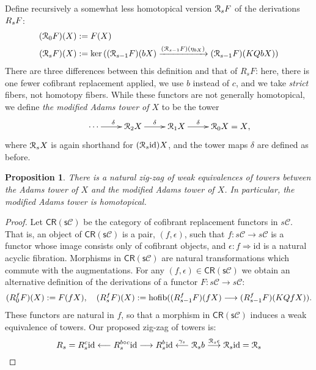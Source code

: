 \documentclass[11pt]{amsart} \renewcommand{\baselinestretch}{1.4}
\theoremstyle{plain}
\newtheorem{prop}[thm]{Proposition}
\theoremstyle{definition}
\renewcommand{\ker}{\mathrm{ker}\,}
\DeclareMathOperator*{\hofib}{hofib}
\renewcommand{\to}{\longrightarrow}
\newcommand{\from}{\longleftarrow}
\newcommand{\calR}{\mathcal{R}}
\newcommand{\calc}{\mathcal{C}}
\newcommand{\Id}{\mathrm{id}}
\newcommand{\algcat}{{\calc}}%
\newcommand{\dupdown}[2]{R_{\smash{#1}}}
\newcommand{\caldup}[1]{\calR_{\smash{#1}}}
\newcommand{\plainD}{R}
\newcommand{\barConstructionMightAbbreviate}{b}
\begin{document}
\begin{Bousfield-Kan spectral sequence}
Define recursively a somewhat less homotopical version $\caldup{s}F$ of the derivations $\dupdown{s}{}F$:
\begin{alignat*}{2}
(\caldup{0}F)(X)
&:=
F(X)%
\\
(\caldup{s}F)(X)
&:=
\ker((\caldup{s-1}F)(\barConstructionMightAbbreviate X)\xrightarrow{(\caldup{s-1}F)(\eta_{\barConstructionMightAbbreviate X})} (\caldup{s-1}F)(KQ\barConstructionMightAbbreviate X))
\end{alignat*}
There are three differences between this definition and that of $\plainD_sF$: here, there is one fewer cofibrant replacement applied, we use $\barConstructionMightAbbreviate $ instead of  $c$, and we take \emph{strict} fibers, not homotopy fibers.
While these functors are not generally homotopical, we define \emph{the modified Adams tower of $X$} to be the tower
\[\xymatrix@R=4mm{
\cdots 
\ar[r]^{\delta}
&%
\caldup{2}X
\ar[r]^{\delta}
&%
\caldup{1}X
\ar[r]^{\delta}&%
\caldup{0}X\makebox[0cm][l]{${}=X$,}
}\]
where $\caldup{s}X$ is again shorthand for $(\caldup{s}\Id )X$, and the tower maps $\delta$ are defined as before.
\begin{prop}
\label{prop:modifiedAdamsTower}
There is a natural zig-zag of weak equivalences of towers between the Adams tower of $X$ and the modified Adams tower of $X$. In particular, the modified Adams tower is homotopical.
\end{prop}
\begin{proof}
Let $\mathsf{CR(s\algcat)}$ be the category of cofibrant replacement functors in $s\algcat$. That is, an object of $\mathsf{CR(s\algcat)}$ is a pair, $(f,\epsilon)$, such that $f:s\algcat\to s\algcat$ is a functor whose image consists only of cofibrant objects, and $\epsilon:f\Rightarrow \Id $ is a natural acyclic fibration. Morphisms in $\mathsf{CR(s\algcat)}$ are natural transformations which commute with the augmentations. For any $(f,\epsilon)\in\mathsf{CR(s\algcat)}$ we obtain an alternative definition of the derivations of a functor $F:s\algcat\to s\algcat$:
\begin{alignat*}{2}
(\plainD_{\smash{0}}^{\smash{f}}F)(X)
:=
F(fX),\quad %
(\plainD_{\smash{s}}^{\smash{f}}F)(X)
:=
\hofib((\plainD_{\smash{s-1}}^{\smash{f}}F)(fX)\to (\plainD_{\smash{s-1}}^{\smash{f}}F)(KQfX)).
\end{alignat*}
These functors are natural in $f$, so that a morphism in $\mathsf{CR(s\algcat)}$ induces a weak equivalence of towers. Our proposed zig-zag of towers is: 
\[\plainD_{\smash{s}}= \plainD_{\smash{s}}^{\smash{c}}\Id \overset{}{\from}\plainD_{\smash{s}}^{\smash{\barConstructionMightAbbreviate \circ c}}\Id \overset{}{\to}\plainD_{\smash{s}}^{\smash{\barConstructionMightAbbreviate }}\Id \overset{\gamma_s}{\from}\caldup{s}\barConstructionMightAbbreviate \overset{\caldup{s}\epsilon}{\to}\caldup{s}\Id =\caldup{s}\]

\end{proof}
\end{Bousfield-Kan spectral sequence}
\end{document}

